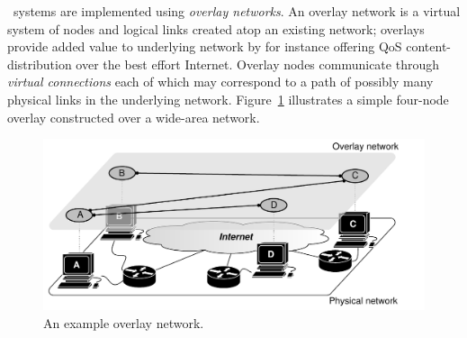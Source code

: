 \p\ systems are implemented using \emph{overlay networks}. 
An overlay network is a virtual system of nodes and logical links
created atop an existing network; overlays provide 
added value to underlying network by for instance offering QoS
content-distribution over the best effort Internet. 
Overlay nodes communicate through \emph{virtual connections} each 
of which may correspond to a path of possibly many physical links 
in the underlying network.
Figure~\ref{figure:overlay} illustrates a simple four-node overlay constructed
over a wide-area network.
\begin{figure}[ht]
\centering
  \includegraphics[scale=0.6]{img/pdf/under-over-lay.pdf}
\caption{An example overlay network.}
\label{figure:overlay}
\end{figure}

